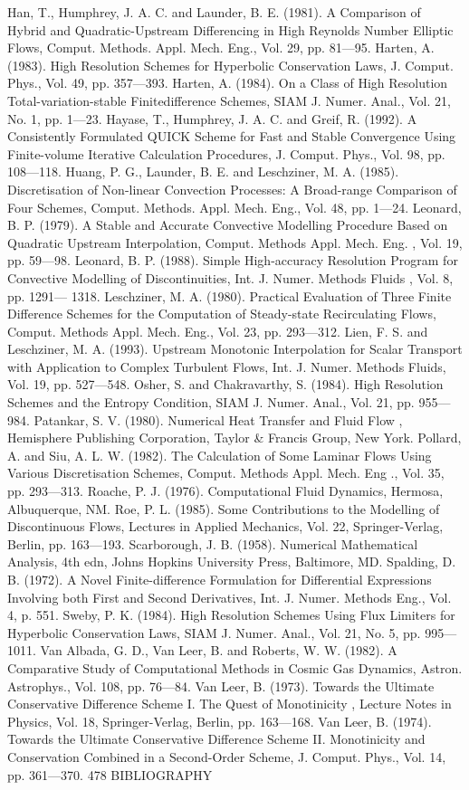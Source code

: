 \documentclass[11pt,a4paper,openany,fontset=none]{ctexbook}
\begin{document}
\begin{sloppypar}
{\small Han, T., Humphrey, J. A. C. and Launder, B. E. (1981). A Comparison of Hybrid and Quadratic-Upstream Differencing in High Reynolds Number Elliptic Flows, Comput. Methods. Appl. Mech. Eng., Vol. 29, pp. 81—95. Harten, A. (1983). High Resolution Schemes for Hyperbolic Conservation Laws, J. Comput. Phys., Vol. 49, pp. 357—393. Harten, A. (1984). On a Class of High Resolution Total-variation-stable Finitedifference Schemes, SIAM J. Numer. Anal., Vol. 21, No. 1, pp. 1—23. Hayase, T., Humphrey, J. A. C. and Greif, R. (1992). A Consistently Formulated QUICK Scheme for Fast and Stable Convergence Using Finite-volume Iterative Calculation Procedures, J. Comput. Phys., Vol. 98, pp. 108—118. Huang, P. G., Launder, B. E. and Leschziner, M. A. (1985). Discretisation of Non-linear Convection Processes: A Broad-range Comparison of Four Schemes, Comput. Methods. Appl. Mech. Eng., Vol. 48, pp. 1—24. Leonard, B. P. (1979). A Stable and Accurate Convective Modelling Procedure Based on Quadratic Upstream Interpolation, Comput. Methods Appl. Mech. Eng. , Vol. 19, pp. 59—98. Leonard, B. P. (1988). Simple High-accuracy Resolution Program for Convective Modelling of Discontinuities, Int. J. Numer. Methods Fluids , Vol. 8, pp. 1291— 1318. Leschziner, M. A. (1980). Practical Evaluation of Three Finite Difference Schemes for the Computation of Steady-state Recirculating Flows, Comput. Methods Appl. Mech. Eng., Vol. 23, pp. 293—312. Lien, F. S. and Leschziner, M. A. (1993). Upstream Monotonic Interpolation for Scalar Transport with Application to Complex Turbulent Flows, Int. J. Numer. Methods Fluids, Vol. 19, pp. 527—548. Osher, S. and Chakravarthy, S. (1984). High Resolution Schemes and the Entropy Condition, SIAM J. Numer. Anal., Vol. 21, pp. 955—984. Patankar, S. V. (1980). Numerical Heat Transfer and Fluid Flow , Hemisphere Publishing Corporation, Taylor \& Francis Group, New York. Pollard, A. and Siu, A. L. W. (1982). The Calculation of Some Laminar Flows Using Various Discretisation Schemes, Comput. Methods Appl. Mech. Eng ., Vol. 35, pp. 293—313. Roache, P. J. (1976). Computational Fluid Dynamics, Hermosa, Albuquerque, NM. Roe, P. L. (1985). Some Contributions to the Modelling of Discontinuous Flows, Lectures in Applied Mechanics, Vol. 22, Springer-Verlag, Berlin, pp. 163—193. Scarborough, J. B. (1958). Numerical Mathematical Analysis, 4th edn, Johns Hopkins University Press, Baltimore, MD. Spalding, D. B. (1972). A Novel Finite-difference Formulation for Differential Expressions Involving both First and Second Derivatives, Int. J. Numer. Methods Eng., Vol. 4, p. 551. Sweby, P. K. (1984). High Resolution Schemes Using Flux Limiters for Hyperbolic Conservation Laws, SIAM J. Numer. Anal., Vol. 21, No. 5, pp. 995—1011. Van Albada, G. D., Van Leer, B. and Roberts, W. W. (1982). A Comparative Study of Computational Methods in Cosmic Gas Dynamics, Astron. Astrophys., Vol. 108, pp. 76—84. Van Leer, B. (1973). Towards the Ultimate Conservative Difference Scheme I. The Quest of Monotinicity , Lecture Notes in Physics, Vol. 18, Springer-Verlag, Berlin, pp. 163—168. Van Leer, B. (1974). Towards the Ultimate Conservative Difference Scheme II. Monotinicity and Conservation Combined in a Second-Order Scheme, J. Comput. Phys., Vol. 14, pp. 361—370. 478 BIBLIOGRAPHY}\par

\end{sloppypar}
\end{document}
